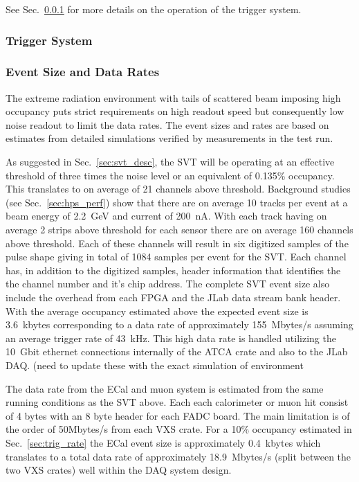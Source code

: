See Sec.~\ref{sec:triggerdaq} for more details on the operation of the trigger system.


\subsubsection{Trigger System}
\label{sec:triggerdaq}


\subsubsection{Event Size and Data Rates}
The extreme radiation environment with tails of scattered beam imposing high occupancy
 puts strict requirements on high readout speed but consequently low noise readout to limit 
 the data rates. The event sizes and rates are based on estimates from detailed simulations 
 verified by measurements in the test run. 
  
As suggested in Sec.~\ref{sec:svt_desc}, the SVT will be operating at an effective threshold of three
times the noise level or an equivalent of 0.135\% occupancy. This translates to on average of 21 channels above threshold. Background studies (see Sec.~\ref{sec:hps_perf}) show that 
there are on average 10 tracks per event at a beam energy of 2.2~GeV and current of 
200~nA. With each track 
having on average 2 strips above threshold for each sensor there are on average 160 channels above threshold. Each of these channels will result in six digitized samples of the 
pulse shape giving in total of 1084 samples per event for the SVT.
Each channel has, in addition to the digitized samples,  header information that identifies the 
the channel number and it's chip address. The complete SVT event size also 
include the overhead from each FPGA and the JLab data stream bank header.  
With the average occupancy 
estimated above the expected event size is 3.6~kbytes corresponding to a data rate of 
approximately 155~Mbytes/s assuming an average trigger rate of 43~kHz.  
This high data rate is handled utilizing 
the 10~Gbit ethernet connections internally of the ATCA crate and also to the JLab DAQ.
{\color{red} (need to update these with the exact simulation of environment}


The data rate from the ECal and muon system is estimated from the same running 
conditions as the SVT above. Each each calorimeter or muon hit consist of 4 bytes 
with an 8 byte header for each FADC board. 
The main limitation is of the order of 50Mbytes/s from each VXS crate. For a 
10\% occupancy estimated in Sec.~\ref{sec:trig_rate} the ECal event size is approximately 0.4~kbytes which translates to a total data rate of approximately 18.9~Mbytes/s 
(split between the two VXS crates) well within the DAQ system design. 

